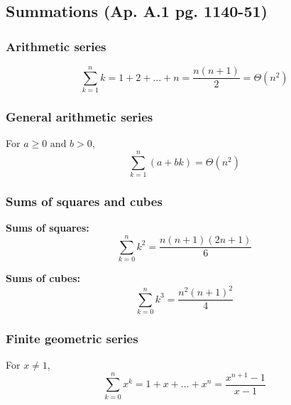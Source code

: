 \subsection{Summations (Ap. A.1 pg. 1140-51)}
    \subsubsection{Arithmetic series}
        \begin{definition}
            \begin{equation}
                \sum_{k=1}^{n} k = 1 + 2 + \ldots + n  = \frac{n(n+1)}{2} = \Theta(n^2)
            \end{equation}
        \end{definition}

    \subsubsection{General arithmetic series}
        \begin{definition}
            For $a \geq 0 \text{ and } b > 0$,
            \begin{equation}
                \sum_{k=1}^{n} (a + bk) = \Theta(n^2)    
            \end{equation}
        \end{definition}

    \subsubsection{Sums of squares and cubes}
        \begin{definition}

            \textbf{Sums of squares:}
            \begin{equation}
                \sum_{k=0}^{n} k^2 = \frac{n(n+1)(2n+1)}{6}
            \end{equation}
            \vspace{1em}

            \textbf{Sums of cubes:}
            \begin{equation}
                \sum_{k=0}^{n} k^3 = \frac{n^2(n+1)^2}{4}
            \end{equation}
        \end{definition}

    \subsubsection{Finite geometric series}
        \begin{definition}
            For $x \neq 1$, 
            \begin{equation}
                \sum_{k=0}^{n} x^k = 1 + x + \ldots + x^n  = \frac{x^{n+1} - 1}{x-1} 
            \end{equation}
        \end{definition}

